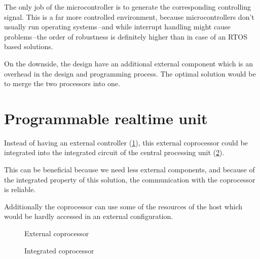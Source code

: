 The only job of the microcontroller is to generate the corresponding controlling signal. This is a far more controlled environment, because microcontrollers don't usually run operating systems\,--and while interrupt handling might cause problems\,--the order of robustness is definitely higher than in case of an RTOS based solutions.

On the downside, the design have an additional external component which is an overhead in the design and programming process. The optimal solution would be to merge the two processors into one.

\section{Programmable realtime unit}

Instead of having an external controller (\cref{fig:ext_controller_hw}), this external coprocessor could be integrated into the integrated circuit of the central processing unit (\cref{fig:int_controller_hw}).

This can be beneficial because we need less external components, and because of the integrated property of this solution, the communication with the coprocessor is reliable.

Additionally the coprocessor can use some of the resources of the host \cpu{} which would be hardly accessed in an external configuration.

\begin{figure}[h]
	\centering
	\caption{External coprocessor}
\label{fig:ext_controller_hw}
\end{figure}

\begin{figure}[h]
	\centering
	\caption{Integrated coprocessor}
\label{fig:int_controller_hw}
\end{figure}

